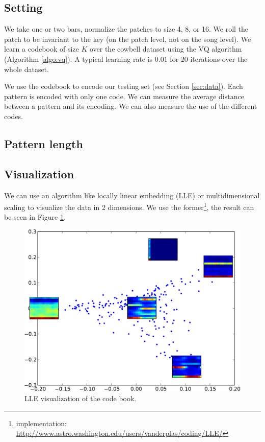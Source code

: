 \documentclass{article}
\begin{document}
\subsection{Setting}
We take one or two bars, normalize the patches to size 4, 8, or 16.
We roll the patch to be invariant to the key (on the patch level, not on
the song level). We learn a codebook of size $K$ over the cowbell dataset 
using the VQ algorithm (Algorithm \ref{algo:vq}). A typical learning rate 
is $0.01$ for $20$ iterations over the whole dataset.

We use the codebook to encode our testing set (see Section \ref{sec:data}).
Each pattern is encoded with only one code. We can measure the average
distance between a pattern and its encoding. We can also measure the use
of the different codes.

\subsection{Pattern length}

\subsection{Visualization}
We can use an algorithm like locally linear embedding \cite{Roweis2000} (LLE) 
or multidimensional scaling \cite{Kruskal1964} to visualize the data in
2 dimensions. We use the former\footnote{implementation: 
\url{http://www.astro.washington.edu/users/vanderplas/coding/LLE/}}, the
result can be seen in Figure \ref{fig:lle}.


\begin{figure}[htb]
\begin{center}
\includegraphics[width=.9\columnwidth]{codes_lle}
\end{center}
\caption{{LLE visualization of the code book.}}
\label{fig:lle}
\end{figure}
\end{document}
